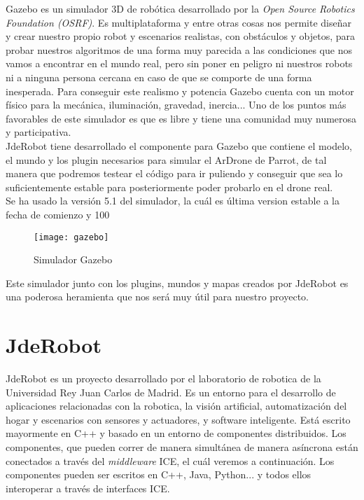 Gazebo es un simulador 3D de robótica desarrollado por la \textit{Open Source Robotics Foundation (OSRF)}. Es multiplataforma y entre otras cosas nos permite diseñar y crear nuestro propio robot y escenarios realistas, con obstáculos y objetos, para probar nuestros algoritmos de una forma muy parecida a las condiciones que nos vamos a encontrar en el mundo real, pero sin poner en peligro ni nuestros robots ni a ninguna persona cercana en caso de que se comporte de una forma inesperada. Para conseguir este realismo y potencia Gazebo cuenta con un motor físico para la mecánica, iluminación, gravedad, inercia... Uno de los puntos más favorables de este simulador es que es libre y tiene una comunidad muy numerosa y participativa.\\

JdeRobot tiene desarrollado el componente para Gazebo que contiene el modelo, el mundo y los plugin necesarios para simular el ArDrone de Parrot, de tal manera que podremos testear el código para ir puliendo y conseguir que sea lo suficientemente estable para posteriormente poder probarlo en el drone real.\\

Se ha usado la versión 5.1 del simulador, la cuál es última version estable a la fecha de comienzo y 100%

\begin{figure}[h!]
\centering
\texttt{[image: gazebo]}
\caption{Simulador Gazebo}
\label{fig:gazebo}
\end{figure}

Este simulador junto con los plugins, mundos y mapas creados por JdeRobot es una poderosa heramienta que nos será muy útil para nuestro proyecto.

\section{JdeRobot}

JdeRobot es un proyecto desarrollado por el laboratorio de robotica de la Universidad Rey Juan Carlos de Madrid. Es un entorno para el desarrollo de aplicaciones relacionadas con la robotica, la visión artificial, automatización del hogar y escenarios con sensores y actuadores, y software inteligente. Está escrito mayormente en C++ y basado en un entorno de componentes distribuidos. Los componentes, que pueden correr de manera simultánea de manera asíncrona están conectados a través del \emph{middleware} ICE, el cuál veremos a continuación. Los componentes pueden ser escritos en C++, Java, Python... y todos ellos interoperar a través de interfaces ICE.\\

